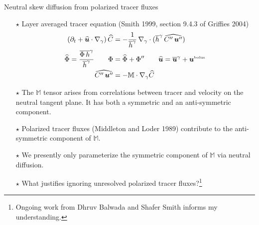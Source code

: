 \documentclass{beamer}
\begin{document}
\begin{frame}{Neutral skew diffusion from polarized tracer fluxes}

\begin{itemize}

\item[$\star$] Layer averaged tracer equation (Smith 1999, section 9.4.3 of Griffies 2004)
\begin{align}
 (\partial_{t} + \widehat{\bm u} \cdot \nabla_{\gamma} ) \,  \widehat{C}
 &= -\frac{1}{\overline{h}^{\gamma}} \, 
   \nabla_{\gamma} \cdot (\overline{h}^{\gamma} 
   \, \widehat{C'' \, {\bm u}''})
  \\
  \widehat{\Phi} = \frac{\overline{\Phi \, h}^{\gamma}}{\overline{h}^{\gamma}}
  \qquad \Phi &= \widehat{\Phi} + \Phi'' 
\qquad
\widehat{\bm u} = \overline{\bm u}^{\gamma} + {\bm u}^{\mbox{\tiny bolus}}
  \\
  \widehat{C'' \, {\bm u}''} 
  &= - \mathbb{M} \cdot \nabla_{\gamma} \widehat{C}
\label{eq:thickness-tracer-evolution}
\end{align}

\item[$\star$] The $\mathbb{M}$ tensor arises from correlations between tracer and velocity on the neutral tangent plane.  It has both a symmetric and an anti-symmetric component.  

\item[$\star$] Polarized tracer fluxes (Middleton and Loder 1989) contribute to the anti-symmetric component of 
$\mathbb{M}$.

\item[$\star$] We presently only parameterize the symmetric component of $\mathbb{M}$ via neutral diffusion. 

\item[$\star$] What justifies ignoring unresolved polarized tracer fluxes?\footnote{\scriptsize Ongoing work from Dhruv Balwada and Shafer Smith informs my understanding.}  


\end{itemize}


\end{frame}
\end{document}
